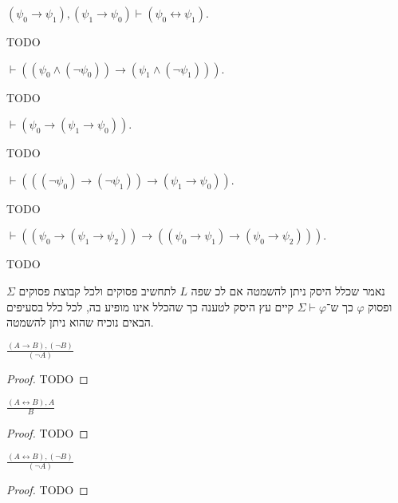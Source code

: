 \subquestion{}
$(\psi_0 \to \psi_1), (\psi_1 \to \psi_0) \vdash (\psi_0 \leftrightarrow \psi_1)$.
\begin{solution}
	TODO
\end{solution}

\subquestion{}
$\vdash ((\psi_0 \land (\lnot \psi_0)) \to (\psi_1 \land (\lnot \psi_1)))$.
\begin{solution}
	TODO
\end{solution}

\subquestion{}
$\vdash (\psi_0 \to (\psi_1 \to \psi_0))$.
\begin{solution}
	TODO
\end{solution}

\subquestion{}
$\vdash (((\lnot \psi_0) \to (\lnot \psi_1)) \to (\psi_1 \to \psi_0))$.
\begin{solution}
	TODO
\end{solution}

\subquestion{}
$\vdash ((\psi_0 \to (\psi_1 \to \psi_2)) \to ((\psi_0 \to \psi_1) \to (\psi_0 \to \psi_2)))$.
\begin{solution}
	TODO
\end{solution}

\question{}
נאמר שכלל היסק ניתן להשמטה אם לכ שפה $L$ לתחשיב פסוקים ולכל קבוצת פסוקים $\Sigma$ ופסוק $\varphi$ כך ש־$\Sigma \vdash \varphi$ קיים עץ היסק לטענה כך שהכלל אינו מופיע בה, לכל כלל בסעיפים הבאים נוכיח שהוא ניתן להשמטה.

\subquestion{}
$\frac{(A \to B), (\lnot B)}{(\lnot A)}$
\begin{proof}
	TODO
\end{proof}

\subquestion{}
$\frac{(A \leftrightarrow B), A}{B}$
\begin{proof}
	TODO
\end{proof}

\subquestion{}
$\frac{(A \leftrightarrow B), (\lnot B)}{(\lnot A)}$
\begin{proof}
	TODO
\end{proof}


